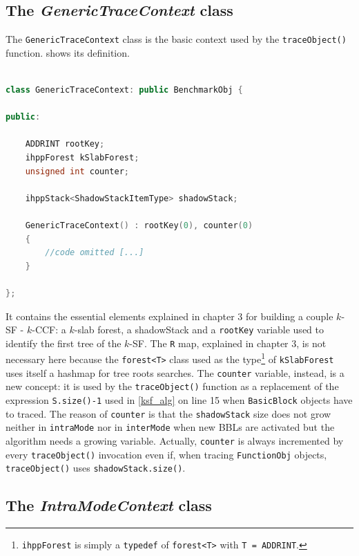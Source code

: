 \documentclass[a4paper,10pt]{report}
\begin{document}
\subsection{The \emph{GenericTraceContext} class}

The \verb|GenericTraceContext| class is the basic context used 
by the \verb|traceObject()| function.  shows its definition.

\begin{lstlisting}[language=C++, 
	caption={partial definition of \texttt{GenericTraceContext}}, 
	label=genericCtx, frame=leftline]

class GenericTraceContext: public BenchmarkObj {

public:

	ADDRINT rootKey;
	ihppForest kSlabForest;
	unsigned int counter;

	ihppStack<ShadowStackItemType> shadowStack;

	GenericTraceContext() : rootKey(0), counter(0) 
	{ 
		//code omitted [...]
	}

};

\end{lstlisting}

\noindent
It contains the essential elements explained in chapter 3 for building 
a couple $k$-SF - $k$-CCF: a $k$-slab forest, a shadowStack and a \verb|rootKey| variable used to identify the first tree of the $k$-SF. 
The \verb|R| map, explained in chapter 3, is not necessary here because the \verb|forest<T>| class used as the type\footnote{\texttt{ihppForest} is simply a \texttt{typedef} of \texttt{forest<T>} with \texttt{T = ADDRINT}.} of \verb|kSlabForest| uses itself 
a hashmap for tree roots searches. The \verb|counter| variable, instead, is a new concept:
it is used by the \verb|traceObject()| function as a replacement of the 
expression \verb|S.size()-1| used in \cref{ksf_alg} on line 15 
when \verb|BasicBlock| objects have to traced. 
The reason of \verb|counter| is that the \verb|shadowStack| size does not grow 
neither in \verb|intraMode| nor in \verb|interMode| when new BBLs are activated but
the algorithm needs a growing variable. Actually, \verb|counter| is always incremented
by every \verb|traceObject()| invocation even if, when tracing \verb|FunctionObj| objects, \verb|traceObject()| uses \verb|shadowStack.size()|.

\subsection{The \emph{IntraModeContext} class}
\end{document}
